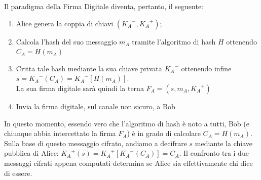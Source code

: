 \documentclass[a4paper,12pt]{tesiinfo}
\begin{document}
Il paradigma della Firma Digitale diventa, pertanto, il seguente: 
\begin{enumerate}
 \item Alice genera la coppia di chiavi $({K_A}^-, {K_A}^+)$;
 \item Calcola l'hash del suo messaggio $m_A$ tramite l'algoritmo di hash $H$ ottenendo $C_A = H(m_A)$
 \item Critta tale hash mediante la sua chiave privata ${K_A}^-$ ottenendo infine \\$s = {K_A}^-(C_A) = {K_A}^-[H(m_A)]$. \\La sua firma digitale sar\`a quindi la terna $F_A = (s, m_A, {K_A}^+)$
 \item Invia la firma digitale, sul canale non sicuro, a Bob
\end{enumerate}
In questo momento, essendo vero che l'algoritmo di hash \`e noto a tutti, Bob (e chiunque abbia intercettato la firma $F_A$) \`e in grado di calcolare $C_A = H(m_A)$. Sulla base di questo messaggio cifrato, andiamo a decifrare $s$ mediante la chiave pubblica di Alice: ${K_A}^+(s) = {K_A}^+[{K_A}^-(C_A)] = C_A$. Il confronto tra i due messaggi cifrati appena computati determina se Alice sia effettivamente chi dice di essere.
\end{document}
